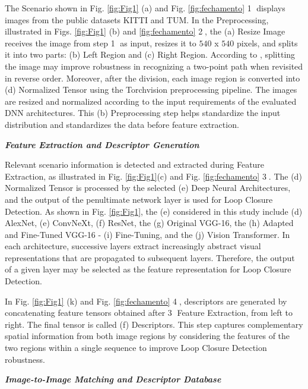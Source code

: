 \documentclass{ieeeaccess}
\newcommand{\circled}[1]{\textcircled{\scriptsize #1}}
\begin{document}
The Scenario shown in Fig. \ref{fig:Fig1} (a) and Fig. \ref{fig:fechamento} \circled{1} displays images from the public datasets KITTI and TUM. In the Preprocessing, illustrated in Figs. \ref{fig:Fig1} (b) and \ref{fig:fechamento} \circled{2}, the (a) Resize Image receives the image from step \circled{1} as input, resizes it to $540$ x $540$ pixels, and splits it into two parts: (b) Left Region and (c) Right Region. According to \cite{Garg2018DontLookBack}, splitting the image may improve robustness in recognizing a two-point path when revisited in reverse order. Moreover, after the division, each image region is converted into (d) Normalized Tensor using the Torchvision preprocessing pipeline. The images are resized and normalized according to the input requirements of the evaluated DNN architectures. This (b) Preprocessing step helps standardize the input distribution and standardizes the data before feature extraction.

\vspace{0.3cm}
\noindent
\emph{\textbf{Feature Extraction and Descriptor Generation}}
\vspace{0.3cm}

Relevant scenario information is detected and extracted during Feature Extraction, as illustrated in Fig. \ref{fig:Fig1}(c) and Fig.  \ref{fig:fechamento} \circled{3}. The (d) Normalized Tensor is processed by the selected (e) Deep Neural Architectures, and the output of the penultimate network layer is used for Loop Closure Detection. As shown in Fig. \ref{fig:Fig1}, the (e) considered in this study include (d) AlexNet, (e) ConvNeXt, (f) ResNet, the (g) Original VGG-16, the (h) Adapted and Fine-Tuned VGG-16 - (i) Fine-Tuning, and the (j) Vision Transformer. In each architecture, successive layers extract increasingly abstract visual representations that are propagated to subsequent layers. Therefore, the output of a given layer may be selected as the feature representation for Loop Closure Detection.

In Fig. \ref{fig:Fig1} (k) and Fig. \ref{fig:fechamento} \circled{4}, descriptors are generated by concatenating feature tensors obtained after \circled{3} Feature Extraction, from left to right. The final tensor is called (f) Descriptors. This step captures complementary spatial information from both image regions by considering the features of the two regions within a single sequence to improve Loop Closure Detection robustness.

\vspace{0.3cm}
\noindent
\emph{\textbf{Image-to-Image Matching and Descriptor Database}}
\vspace{0.3cm}
\end{document}
